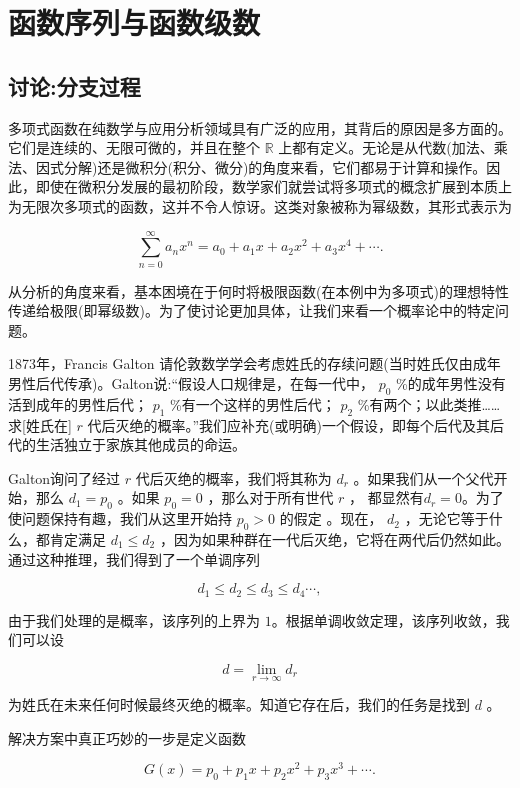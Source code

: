 \chapter{函数序列与函数级数}
\label{chap:6}
\section{讨论:分支过程}
\label{sec:6.1}
多项式函数在纯数学与应用分析领域具有广泛的应用，其背后的原因是多方面的。它们是连续的、无限可微的，并且在整个 \(\mathbb{R}\) 上都有定义。无论是从代数(加法、乘法、因式分解)还是微积分(积分、微分)的角度来看，它们都易于计算和操作。因此，即使在微积分发展的最初阶段，数学家们就尝试将多项式的概念扩展到本质上为无限次多项式的函数，这并不令人惊讶。这类对象被称为幂级数，其形式表示为

\[
\mathop{\sum }\limits_{{n = 0}}^{\infty }{a}_{n}{x}^{n} = {a}_{0} + {a}_{1}x + {a}_{2}{x}^{2} + {a}_{3}{x}^{4} + \cdots .
\]

从分析的角度来看，基本困境在于何时将极限函数(在本例中为多项式)的理想特性传递给极限(即幂级数)。为了使讨论更加具体，让我们来看一个概率论中的特定问题。

1873年，Francis Galton 请伦敦数学学会考虑姓氏的存续问题(当时姓氏仅由成年男性后代传承)。Galton说:“假设人口规律是，在每一代中， \({p}_{0}\) \%的成年男性没有活到成年的男性后代； \({p}_{1}\) \%有一个这样的男性后代； \({p}_{2}\) \%有两个；以此类推……求[姓氏在] \(r\) 代后灭绝的概率。”我们应补充(或明确)一个假设，即每个后代及其后代的生活独立于家族其他成员的命运。

Galton询问了经过 \(r\) 代后灭绝的概率，我们将其称为 \({d}_{r}\) 。如果我们从一个父代开始，那么 \({d}_{1} = {p}_{0}\) 。如果 \({p}_{0} = 0\) ，那么对于所有世代 \(r\) ， 都显然有\({d}_{r} = 0\)。为了使问题保持有趣，我们从这里开始持 \({p}_{0} > 0\) 的假定 。现在， \({d}_{2}\) ，无论它等于什么，都肯定满足 \({d}_{1} \leq  {d}_{2}\) ，因为如果种群在一代后灭绝，它将在两代后仍然如此。通过这种推理，我们得到了一个单调序列

\[
{d}_{1} \leq  {d}_{2} \leq  {d}_{3} \leq  {d}_{4}\cdots ,
\]

由于我们处理的是概率，该序列的上界为 $1$。根据单调收敛定理，该序列收敛，我们可以设

\[
d = \mathop{\lim }\limits_{{r \rightarrow  \infty }}{d}_{r}
\]

为姓氏在未来任何时候最终灭绝的概率。知道它存在后，我们的任务是找到 \(d\) 。

解决方案中真正巧妙的一步是定义函数

\[
G\left( x\right)  = {p}_{0} + {p}_{1}x + {p}_{2}{x}^{2} + {p}_{3}{x}^{3} + \cdots .
\]


